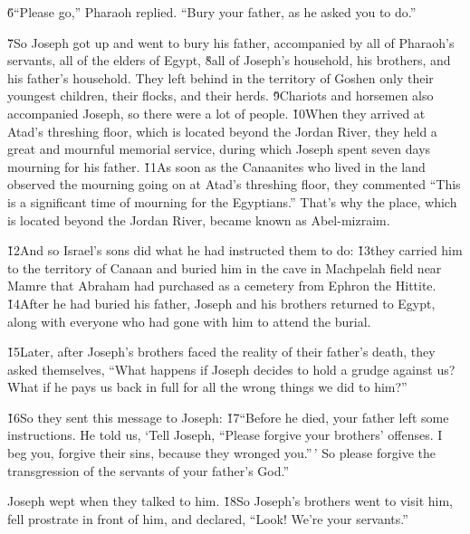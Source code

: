 \v{6}``Please go,'' Pharaoh replied. ``Bury your father, as he asked you to do.''

\v{7}So Joseph got up and went to bury his father, accompanied by all of Pharaoh's servants, all of the elders of Egypt, \v{8}all of Joseph's household, his brothers, and his father's household. They left behind in the territory of Goshen only their youngest children, their flocks, and their herds. \v{9}Chariots and horsemen also accompanied Joseph, so there were a lot of people. \v{10}When they arrived at Atad's threshing floor, which is located beyond the Jordan River, they held a great and mournful memorial service, during which Joseph spent seven days mourning for his father. \v{11}As soon as the Canaanites who lived in the land observed the mourning going on at Atad's threshing floor, they commented ``This is a significant time of mourning for the Egyptians.'' That's why the place, which is located beyond the Jordan River, became known as Abel-mizraim.

\v{12}And so Israel's sons did what he had instructed them to do: \v{13}they carried him to the territory of Canaan and buried him in the cave in Machpelah field near Mamre that Abraham had purchased as a cemetery from Ephron the Hittite. \v{14}After he had buried his father, Joseph and his brothers returned to Egypt, along with everyone who had gone with him to attend the burial.

\v{15}Later, after Joseph's brothers faced the reality of their father's death, they asked themselves, ``What happens if Joseph decides to hold a grudge against us? What if he pays us back in full for all the wrong things we did to him?''

\v{16}So they sent this message to Joseph: \v{17}``Before he died, your father left some instructions. He told us, `Tell Joseph, ``Please forgive your brothers' offenses. I beg you, forgive their sins, because they wronged you.''\,' So please forgive the transgression of the servants of your father's God.''

Joseph wept when they talked to him. \v{18}So Joseph's brothers went to visit him, fell prostrate in front of him, and declared, ``Look! We're your servants.''

